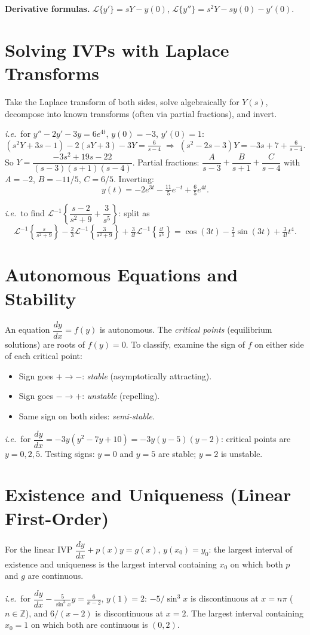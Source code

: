 \documentclass[11pt]{article}
\newcommand{\dydx}{\dfrac{dy}{dx}}
\newcommand{\Lap}{\mathcal{L}}
\begin{document}
\textbf{Derivative formulas.} $\Lap\{y'\} = sY - y(0)$, $\Lap\{y''\} = s^2 Y - sy(0) - y'(0)$.
 
\section*{Solving IVPs with Laplace Transforms}
Take the Laplace transform of both sides, solve algebraically for $Y(s)$, decompose into known transforms (often via partial fractions), and invert.
 
\textit{i.e.}\ for $y'' - 2y' - 3y = 6e^{4t}$, $y(0) = -3$, $y'(0) = 1$:
\[
(s^2 Y + 3s - 1) - 2(sY + 3) - 3Y = \tfrac{6}{s - 4} \;\Longrightarrow\; (s^2 - 2s - 3)Y = -3s + 7 + \tfrac{6}{s-4}.
\]
So $Y = \dfrac{-3s^2 + 19s - 22}{(s-3)(s+1)(s-4)}$. Partial fractions: $\dfrac{A}{s-3} + \dfrac{B}{s+1} + \dfrac{C}{s-4}$ with $A = -2$, $B = -11/5$, $C = 6/5$. Inverting:
\[
y(t) = -2e^{3t} - \tfrac{11}{5}e^{-t} + \tfrac{6}{5}e^{4t}.
\]
 
\textit{i.e.}\ to find $\Lap^{-1}\!\left\{\dfrac{s-2}{s^2 + 9} + \dfrac{3}{s^5}\right\}$: split as
\[
\Lap^{-1}\!\left\{\tfrac{s}{s^2 + 9}\right\} - \tfrac{2}{3}\Lap^{-1}\!\left\{\tfrac{3}{s^2 + 9}\right\} + \tfrac{3}{4!}\Lap^{-1}\!\left\{\tfrac{4!}{s^5}\right\} = \cos(3t) - \tfrac{2}{3}\sin(3t) + \tfrac{3}{4!}t^4.
\]
 
\section*{Autonomous Equations and Stability}
An equation $\dydx = f(y)$ is autonomous. The \emph{critical points} (equilibrium solutions) are roots of $f(y) = 0$. To classify, examine the sign of $f$ on either side of each critical point:
\begin{itemize}[leftmargin=*]
    \item Sign goes $+ \to -$: \emph{stable} (asymptotically attracting).
    \item Sign goes $- \to +$: \emph{unstable} (repelling).
    \item Same sign on both sides: \emph{semi-stable}.
\end{itemize}
 
\textit{i.e.}\ for $\dydx = -3y(y^2 - 7y + 10) = -3y(y-5)(y-2)$: critical points are $y = 0, 2, 5$. Testing signs: $y = 0$ and $y = 5$ are stable; $y = 2$ is unstable.
 
\section*{Existence and Uniqueness (Linear First-Order)}
For the linear IVP $\dydx + p(x)y = g(x)$, $y(x_0) = y_0$: the largest interval of existence and uniqueness is the largest interval containing $x_0$ on which both $p$ and $g$ are continuous.
 
\textit{i.e.}\ for $\dydx - \frac{5}{\sin^3 x}y = \frac{6}{x - 2}$, $y(1) = 2$: $-5/\sin^3 x$ is discontinuous at $x = n\pi$ ($n \in \mathbb{Z}$), and $6/(x - 2)$ is discontinuous at $x = 2$. The largest interval containing $x_0 = 1$ on which both are continuous is $(0, 2)$.
 

 
\end{document}
